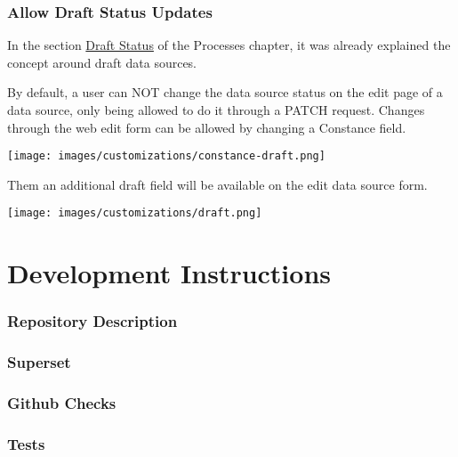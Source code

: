 \documentclass[
]{book}
\begin{document}
\hypertarget{allow-draft-status-updates}{%
\subsection*{Allow Draft Status Updates}\label{allow-draft-status-updates}}

In the section \href{processes.html\#draft-status}{Draft Status} of the Processes chapter, it was already explained the concept around draft data sources.

By default, a user can NOT change the data source status on the edit page of a data source, only being allowed to do it through a PATCH request.
Changes through the web edit form can be allowed by changing a Constance field.

\texttt{[image: images/customizations/constance-draft.png]}

Them an additional draft field will be available on the edit data source form.

\texttt{[image: images/customizations/draft.png]}

\hypertarget{development-instructions}{%
\chapter{Development Instructions}\label{development-instructions}}

\hypertarget{repository-description}{%
\subsection*{Repository Description}\label{repository-description}}

\hypertarget{superset}{%
\subsection*{Superset}\label{superset}}

\hypertarget{github-checks}{%
\subsection*{Github Checks}\label{github-checks}}

\hypertarget{tests}{%
\subsection*{Tests}\label{tests}}
\end{document}
